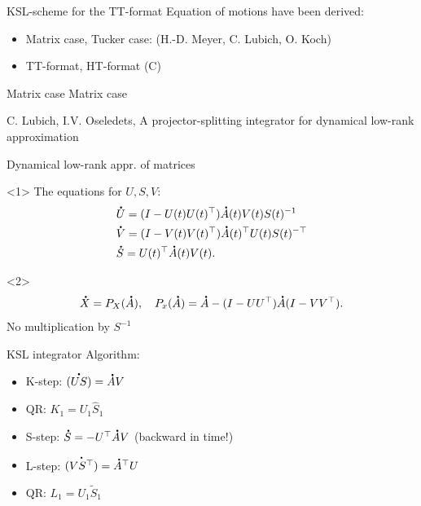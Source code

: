 \documentclass{beamer}[14pt, presentation]
\newcommand*{\dt}[1]{\accentset{\mbox{\large\bfseries .}}{#1}}
\begin{document}
\begin{frame}[label=sec-7-3]{KSL-scheme for the TT-format}
Equation of motions have been derived:
\begin{itemize}
\item Matrix case, Tucker case: (H.-D. Meyer, C. Lubich, O. Koch)
\item TT-format, HT-format (C)
\end{itemize}
\end{frame}

\begin{frame}[label=sec-7-4]{Matrix case}
Matrix case
\vskip 2mm
\begin{footnotesize}
C. Lubich, I.V. Oseledets, A projector-splitting integrator for
dynamical low-rank approximation
\vskip 2mm
\end{footnotesize}
\end{frame}

\begin{frame}[label=sec-7-5]{Dynamical low-rank appr. of matrices}
\begin{onlyenv}<1>
The equations for $U, S, V$: \\
\begin{equation*}
\begin{split}
&\dt{U} = (I - U(t) U(t)^{\top})\dt{A}(t) V(t) S(t) ^{-1}\\
&\dt{V} = (I - V(t)V(t)^{\top})\dt{A}(t)^{\top} U(t) S(t)^{-\top} \\
&\dt{S} = U(t)^{\top} \dt{A}(t) V(t).
\end{split}
\end{equation*}
\end{onlyenv}

\begin{onlyenv}<2>
\begin{equation*}
\dt{X} = P_X(\dt A), \quad P_x(\dt A) = \dt A - ( I - UU^{\top}) \dt A( I - VV^{\top}).
\end{equation*}
No multiplication by $S^{-1}$
\end{onlyenv}
\end{frame}

\begin{frame}[label=sec-7-6]{KSL integrator}
Algorithm:
\begin{itemize}
\item K-step: $\dt{(US)} = \dt{A} V$
\item QR: $K_1 = U_1 \widehat{S}_1$
\item S-step: $\dt{S} = -U^{\top} \dt{A} V$ (backward in time!)
\item L-step: $\dt{(VS^{\top})} = \dt{A}^{\top} U$
\item QR: $L_1 = U_1 \widetilde{S}_1$
\end{itemize}
\end{frame}
\end{document}
